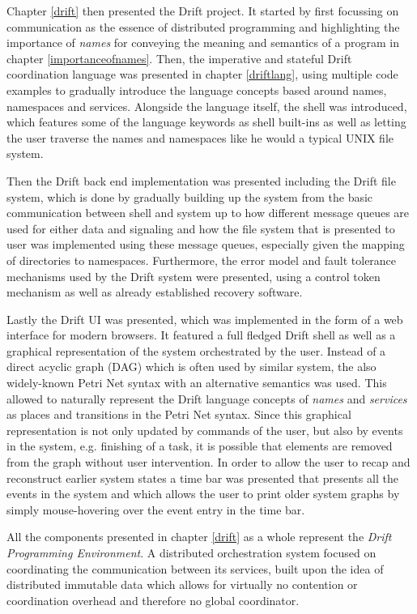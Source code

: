 Chapter \ref{drift} then presented the Drift project. It started
by first focussing on communication as the essence of distributed
programming and highlighting the importance of \textit{names}
for conveying the meaning and semantics of a program in chapter
\ref{importanceofnames}. Then, the imperative and stateful Drift
coordination language was presented
in chapter \ref{driftlang}, using multiple code examples to
gradually introduce the language concepts based around names,
namespaces and services. Alongside the language itself, the shell
was introduced, which features some of the language keywords as
shell built-ins as well as letting the user traverse the names
and namespaces like he would a typical UNIX file system.

Then the Drift back end implementation was presented including
the Drift file system, which is done by gradually building up the
system from the basic communication between shell and system up to
how different message queues are used for either data and signaling
and how the file system that is presented to user was implemented
using these message queues, especially given the mapping of directories
to namespaces. Furthermore, the error model and fault tolerance
mechanisms used by the Drift system were presented, using a control
token mechanism as well as already established recovery software.
\newline

Lastly the Drift UI was presented, which was implemented in the
form of a web interface for modern browsers. It featured a full
fledged Drift shell as well as a graphical representation of
the system orchestrated by the user. Instead of a direct acyclic
graph (DAG) which is often used by similar system, the also
widely-known Petri Net syntax with an alternative semantics
was used. This allowed to naturally represent the Drift language
concepts of \textit{names} and \textit{services} as places
and transitions in the Petri Net syntax. Since this
graphical representation is not only updated by commands of
the user, but also by events in the system, e.g. finishing
of a task, it is possible that elements are removed from the
graph without user intervention. In order to allow the user
to recap and reconstruct earlier system states a time bar was
presented that presents all the events in the system and which
allows the user to print older system graphs by simply mouse-hovering
over the event entry in the time bar.
\newline

All the components presented in chapter \ref{drift} as a whole
represent the \textit{Drift Programming Environment}. A distributed
orchestration system focused on coordinating the communication between
its services, built upon the idea of distributed immutable data
which allows for virtually no contention or coordination overhead
and therefore no global coordinator.

